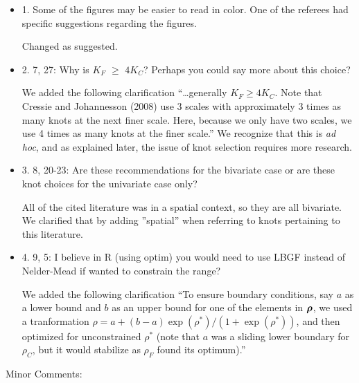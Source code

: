 \documentclass[12pt, titlepage]{article}
\def\brho{\mbox{\boldmath $\rho$}}
\begin{document}
\begin{itemize}
\item {\color{red!70!black} 1. Some of the figures may be easier to read in color.  One of the referees had specific suggestions regarding the figures. }

  Changed as suggested.

\item {\color{red!70!black} 2. 7, 27: Why is $K_F$ $\ge$ $4K_C$?  Perhaps you could say more about this choice?}

  We added the following clarification ``\dots generally $K_F \geq 4K_C$. Note that Cressie and Johannesson (2008) use 3 scales with approximately 3 times as many knots at the next finer scale. Here, because we only have two scales, we use 4 times as many knots at the finer scale.'' We recognize that this is \emph{ad hoc}, and as explained later, the issue of knot selection requires more research.

\item {\color{red!70!black} 3. 8, 20-23:  Are these recommendations for the bivariate case or are these knot choices for the univariate case only?}

All of the cited literature was in a spatial context, so they are all bivariate.  We clarified that by adding ''spatial'' when referring to knots pertaining to this literature.

\item {\color{red!70!black} 4. 9, 5: I believe in R (using optim) you would need to use LBGF instead of Nelder-Mead if wanted to constrain the range? }

We added the following clarification ``To ensure boundary conditions, say $a$ as a lower bound and $b$ as an upper bound for one of the elements in $\brho$, we used a tranformation $\rho = a + (b-a)\exp(\rho^*)/(1 + \exp(\rho^*))$, and then optimized for unconstrained $\rho^*$ (note that $a$ was a sliding lower boundary for $\rho_C$, but it would stabilize as $\rho_F$ found its optimum).''

\end{itemize}

\vspace{.5cm}
{\color{red!70!black} \noindent \Large Minor Comments:}
\end{document}
